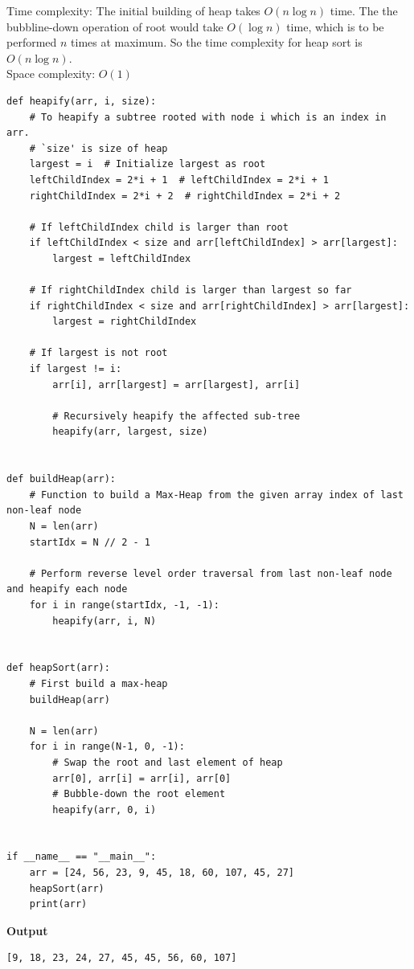 \documentclass[a4paper,11pt]{book}
\begin{document}
\noindent Time complexity: The initial building of heap takes $O(n\log n)$ time. The the bubbline-down operation of root would take $O(\log n)$ time, which is to be performed $n$ times at maximum. So the time complexity for heap sort is $O(n\log n)$.\\
\noindent Space complexity: $O(1)$
\begin{lstlisting}
def heapify(arr, i, size):
    # To heapify a subtree rooted with node i which is an index in arr. 
    # `size' is size of heap
    largest = i  # Initialize largest as root
    leftChildIndex = 2*i + 1  # leftChildIndex = 2*i + 1
    rightChildIndex = 2*i + 2  # rightChildIndex = 2*i + 2
 
    # If leftChildIndex child is larger than root
    if leftChildIndex < size and arr[leftChildIndex] > arr[largest]:
        largest = leftChildIndex
 
    # If rightChildIndex child is larger than largest so far
    if rightChildIndex < size and arr[rightChildIndex] > arr[largest]:
        largest = rightChildIndex
 
    # If largest is not root
    if largest != i:
        arr[i], arr[largest] = arr[largest], arr[i]
 
        # Recursively heapify the affected sub-tree
        heapify(arr, largest, size)
 

def buildHeap(arr):
    # Function to build a Max-Heap from the given array index of last non-leaf node
    N = len(arr)
    startIdx = N // 2 - 1
 
    # Perform reverse level order traversal from last non-leaf node and heapify each node
    for i in range(startIdx, -1, -1):
        heapify(arr, i, N)


def heapSort(arr):
    # First build a max-heap
    buildHeap(arr)
    
    N = len(arr)
    for i in range(N-1, 0, -1):
        # Swap the root and last element of heap
        arr[0], arr[i] = arr[i], arr[0]
        # Bubble-down the root element
        heapify(arr, 0, i)


if __name__ == "__main__":
    arr = [24, 56, 23, 9, 45, 18, 60, 107, 45, 27]
    heapSort(arr)
    print(arr)
\end{lstlisting}
\textbf{Output}
\begin{lstlisting}
[9, 18, 23, 24, 27, 45, 45, 56, 60, 107]
\end{lstlisting}
\end{document}
